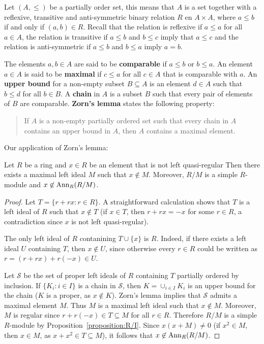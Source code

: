 Let $(A,\leq)$ be a partially order set, this means that $A$ is a set together with a 
reflexive, transitive and anti-symmetric binary relation
$R$ en $A\times A$, where $a\leq b$ if and only if $(a,b)\in R$. 
Recall that the relation is reflexive if $a\leq a$ for all $a\in A$, the relation is transitive if 
$a\leq b$ and $b\leq c$ imply that 
$a\leq c$ and the relation is anti-symmetric if $a\leq b$ and $b\leq a$ imply $a=b$.

The elements $a,b\in A$ are said to be \textbf{comparable} if $a\leq b$ or $b\leq
a$. An element $a\in A$ is said to be \textbf{maximal} if 
$c\leq a$ 
for all $c\in A$
that is comparable with $a$. 
An \textbf{upper bound} for a non-empty subset $B\subseteq A$ is an element $d\in
A$ such that $b\leq d$ for all $b\in B$. A \textbf{chain} in $A$ is a subset 
$B$ such that every pair of elements of $B$ are comparable. 
\textbf{Zorn's lemma} states the following property: 
\begin{quote}
If $A$ is a non-empty partially ordered set such that every chain in 
$A$ contains an upper bound in $A$, then $A$ contains a maximal element. 
\end{quote}

Our application of Zorn's lemma:

\begin{lemma}
	\label{lemma:maxreg}
	Let $R$ be a ring and $x\in R$ be an element that is not left quasi-regular Then there
	exists a maximal left ideal $M$ such that 
	$x\not\in M$. Moreover, $R/M$ is a simple $R$-module and  
	$x\not\in\operatorname{Ann}_R(R/M)$.
\end{lemma}

\begin{proof}
	Let $T=\{r+rx:r\in R\}$. A straightforward calculation shows that $T$ is a left ideal of 
	$R$ such that $x\not\in T$ (if $x\in T$, then $r+rx=-x$ for some 
	$r\in R$, a contradiction since $x$ is not left quasi-regular). 

	The only left ideal of $R$ contanining 
	$T\cup\{x\}$ is $R$. Indeed, if there exists a left ideal $U$ containing $T$, then 
    $x\not\in U$, since otherwise every $r\in R$ could be written as 
	$r=(r+rx)+r(-x)\in U$. 

	Let $\mathcal{S}$ be the set of proper left ideals of $R$ containing 
	$T$ partially ordered by inclusion. If $\{K_i:i\in I\}$ is a chain in 
	$\mathcal{S}$, then $K=\cup_{i\in I}K_i$ is an upper bound for the chain 
	($K$ is a proper, as $x\not\in K$). Zorn's lemma implies that 
	$\mathcal{S}$ admits a maximal element $M$. Thus $M$
	is a maximal left ideal such that $x\not\in M$. Moreover, $M$ is regular
	since $r+r(-x)\in T\subseteq M$ for all $r\in R$. Therefore $R/M$ is a simple 
	$R$-module by Proposition~\ref{proposition:R/I}. Since $x(x+M)\ne
	0$ (if $x^2\in M$, then  $x\in M$, as $x+x^2\in
	T\subseteq M$), it follows that $x\not\in\operatorname{Ann}_R(R/M)$.
\end{proof}

